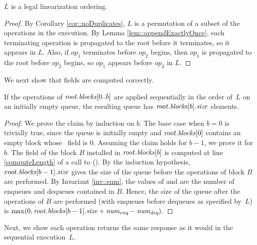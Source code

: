 \begin{lemma} \label{linearSat}
$L$ is a legal linearization ordering.
\end{lemma}
\begin{proof}
By Corollary \ref{cor::noDuplicates}, $L$ is a permutation of a subset of the operations in the execution.
By Lemma \ref{lem::appendExactlyOnce}, each terminating operation is propagated to the root before it terminates,
so it appears in $L$.
Also, if $op_{1}$ terminates before $op_{2}$ begins, then $op_{1}$ 
is propagated to the root before $op_2$ begins, so $op_1$ appears before $op_2$ in $L$.
\end{proof}

We next show that  fields are computed correctly.
\begin{lemma}
\label{sizeCorrectness}
If the operations of $\mbox{\textnormal{\textit{root}}}.\mbox{\textit{blocks}}[0..b]$ are applied sequentially in the order of~$L$ on an initially empty queue, the resulting queue has $\mbox{\textnormal{\textit{root}}}.\mbox{\textit{blocks}}[b].\mbox{\textit{size}}$ elements.  
\end{lemma}

\begin{proof}
We prove the claim by induction on $b$. 
The base case when ${b=0}$ is trivially true, since the queue is initially empty and 
$\mbox{\textnormal{\textit{root}}}.\mbox{\textit{blocks}}[0]$ contains an empty block whose \size\ field is $0$. 
Assuming the claim holds for $b-1$, we prove it for $b$.
The  field of the block $B$ installed in $\mbox{\textnormal{\textit{root}}}.\mbox{\textit{blocks}}[b]$ is computed
at line \ref{computeLength} of a call to ().
By the induction hypothesis, $root.\mbox{\textit{blocks}}[b-1].\mbox{\textit{size}}$ gives the size of the queue before the operations
of block $B$ are performed.
By Invariant \ref{inv::sum}, the values of  and 
are the number of enqueues and dequeues contained in $B$.
Hence, the size of the queue after the operations of $B$ are performed (with enqueues before dequeues as specified by~$L$)
is $\max(0, \mbox{\textnormal{\textit{root}}}.\mbox{\textit{blocks}}[b-1].\mbox{\textit{size}} + \mbox{\textnormal{\textit{num\textsubscript{enq}}}} - \mbox{\textnormal{\textit{num\textsubscript{deq}}}})$.
\end{proof}

Next, we show each operation returns the same response as it would in the sequential execution~$L$.

